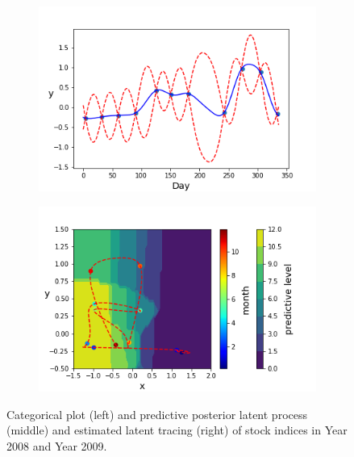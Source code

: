 \documentclass{article}
\begin{document}
\begin{figure}[ht!]
\begin{subfigure}[b]{0.24\textwidth}
	\end{subfigure}
	\begin{subfigure}[b]{0.24\textwidth}
		\includegraphics[width=\textwidth]{pic/year2009_D1}
	\end{subfigure}
	\begin{subfigure}[b]{0.24\textwidth}
		\includegraphics[width=\textwidth]{pic/year2009_trace}
	\end{subfigure}
	\caption{Categorical plot (left) and predictive posterior latent process (middle) and estimated latent tracing (right) of stock indices in Year 2008 and Year 2009.}
	\label{fig:stock}
\end{figure}
\end{document}
